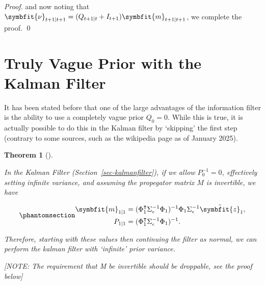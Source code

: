 \documentclass[
]{report}
\newcommand{\bv}[1]{\symbfit{#1}}
\theoremstyle{plain}
\theoremstyle{plain}
\newtheorem{theorem}{Theorem}[section]
\theoremstyle{plain}
\theoremstyle{remark}
\begin{document}
\begin{proof}
and now noting that
\(\bv\nu_{t+1\mid t+1} = (Q_{t+1\mid t} + I_{t+1}) \bv m_{t+1\mid t+1}\),
we complete the proof. \qed
\end{proof}

\section{Truly Vague Prior with the Kalman Filter}\label{sec-vagueprior}

It has been stated before that one of the large advantages of the
information filter is the ability to use a completely vague prior
\(Q_{0}=0\). While this is true, it is actually possible to do this in
the Kalman filter by `skipping' the first step (contrary to some
sources, such as the wikipedia page as of January 2025).

\begin{theorem}[]\protect\hypertarget{thm-vagueprior}{}\label{thm-vagueprior}

In the Kalman Filter (Section~\ref{sec-kalmanfilter}), if we allow
\(P_{0}^{-1} = 0\), effectively setting infinite variance, and assuming
the propegator matrix \(M\) is invertible, we have

\begin{equation}\phantomsection\label{eq-kalmanvague}{\begin{split}
  \bv m_{1\mid1} &= (\Phi_1^\intercal \Sigma_\epsilon^{-1} \Phi_1)^{-1} \Phi_1 \Sigma_\epsilon^{-1} \tilde{\bv z}_1,\\
  P_{1\mid1} &= (\Phi_1^\intercal \Sigma_\epsilon^{-1} \Phi_1)^{-1}.
\end{split}
}\end{equation}

Therefore, starting with these values then continuing the filter as
normal, we can perform the kalman filter with `infinite' prior variance.

{{[}NOTE: The requirement that M be invertible should be droppable, see
the proof below{]}}

\end{theorem}
\end{document}
